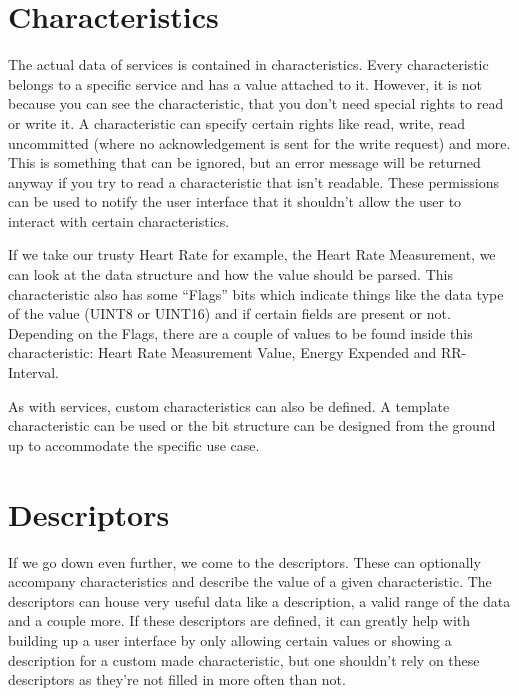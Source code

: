 \documentclass[pdftex,a4paper,12pt,twoside]{report}
\begin{document}
\section{Characteristics}
\label{sec:characteristics}
The actual data of services is contained in characteristics. Every characteristic belongs to a specific service and has a value attached to it. However, it is not because you can see the characteristic, that you don't need special rights to read or write it. A characteristic can specify certain rights like read, write, read uncommitted (where no acknowledgement is sent for the write request) and more. This is something that can be ignored, but an error message will be returned anyway if you try to read a characteristic that isn't readable. These permissions can be used to notify the user interface that it shouldn't allow the user to interact with certain characteristics.

If we take our trusty Heart Rate for example, the Heart Rate Measurement, we can look at the data structure and how the value should be parsed. This characteristic also has some ``Flags'' bits which indicate things like the data type of the value (UINT8 or UINT16) and if certain fields are present or not. Depending on the Flags, there are a couple of values to be found inside this characteristic: Heart Rate Measurement Value, Energy Expended and RR-Interval.

As with services, custom characteristics can also be defined. A template characteristic can be used or the bit structure can be designed from the ground up to accommodate the specific use case.

\section{Descriptors}
\label{sec:descriptors}
If we go down even further, we come to the descriptors. These can optionally accompany characteristics and describe the value of a given characteristic. The descriptors can house very useful data like a description, a valid range of the data and a couple more. If these descriptors are defined, it can greatly help with building up a user interface by only allowing certain values or showing a description for a custom made characteristic, but one shouldn't rely on these descriptors as they're not filled in more often than not.
\end{document}
